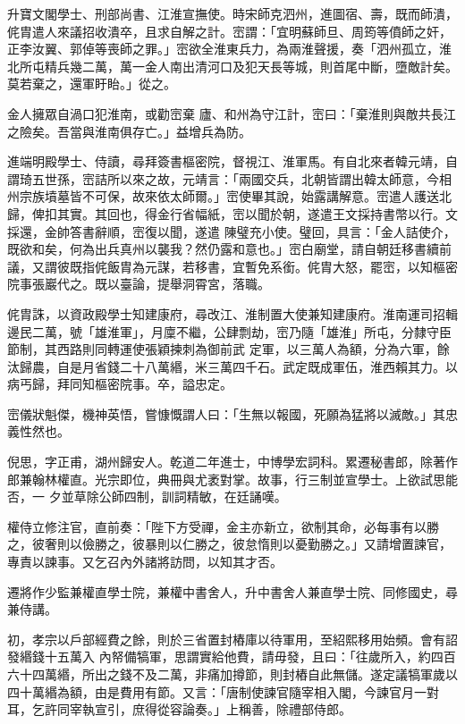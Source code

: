 \begin{pinyinscope}
 升寶文閣學士、刑部尚書、江淮宣撫使。時宋師克泗州，進圖宿、壽，既而師潰，侂胄遣人來議招收潰卒，且求自解之計。崈謂：「宜明蘇師旦、周筠等僨師之奸，正李汝翼、郭倬等喪師之罪。」崈欲全淮東兵力，為兩淮聲援，奏「泗州孤立，淮北所屯精兵幾二萬，萬一金人南出清河口及犯天長等城，則首尾中斷，墮敵計矣。莫若棄之，還軍盱眙。」從之。



 金人擁眾自渦口犯淮南，或勸崈棄
 廬、和州為守江計，崈曰：「棄淮則與敵共長江之險矣。吾當與淮南俱存亡。」益增兵為防。



 進端明殿學士、侍讀，尋拜簽書樞密院，督視江、淮軍馬。有自北來者韓元靖，自謂琦五世孫，崈詰所以來之故，元靖言：「兩國交兵，北朝皆謂出韓太師意，今相州宗族墳墓皆不可保，故來依太師爾。」崈使畢其說，始露講解意。崈遣人護送北歸，俾扣其實。其回也，得金行省幅紙，崈以聞於朝，遂遣王文採持書幣以行。文採還，金帥答書辭順，崈復以聞，遂遣
 陳璧充小使。璧回，具言：「金人詰使介，既欲和矣，何為出兵真州以襲我？然仍露和意也。」崈白廟堂，請自朝廷移書續前議，又謂彼既指侂飯胄為元謀，若移書，宜暫免系銜。侂胄大怒，罷崈，以知樞密院事張巖代之。既以臺論，提舉洞霄宮，落職。



 侂胄誅，以資政殿學士知建康府，尋改江、淮制置大使兼知建康府。淮南運司招輯邊民二萬，號「雄淮軍」，月廩不繼，公肆剽劫，崈乃隨「雄淮」所屯，分隸守臣節制，其西路則同轉運使張穎揀刺為御前武
 定軍，以三萬人為額，分為六軍，餘汰歸農，自是月省錢二十八萬緡，米三萬四千石。武定既成軍伍，淮西賴其力。以病丐歸，拜同知樞密院事。卒，謚忠定。



 崈儀狀魁傑，機神英悟，嘗慷慨謂人曰：「生無以報國，死願為猛將以滅敵。」其忠義性然也。



 倪思，字正甫，湖州歸安人。乾道二年進士，中博學宏詞科。累遷秘書郎，除著作郎兼翰林權直。光宗即位，典冊與尤袤對掌。故事，行三制並宣學士。上欲試思能否，一
 夕並草除公師四制，訓詞精敏，在廷誦嘆。



 權侍立修注官，直前奏：「陛下方受禪，金主亦新立，欲制其命，必每事有以勝之，彼奢則以儉勝之，彼暴則以仁勝之，彼怠惰則以憂勤勝之。」又請增置諫官，專責以諫事。又乞召內外諸將訪問，以知其才否。



 遷將作少監兼權直學士院，兼權中書舍人，升中書舍人兼直學士院、同修國史，尋兼侍講。



 初，孝宗以戶部經費之餘，則於三省置封樁庫以待軍用，至紹熙移用始頻。會有詔發緡錢十五萬入
 內帑備犒軍，思謂實給他費，請毋發，且曰：「往歲所入，約四百六十四萬緡，所出之錢不及二萬，非痛加撙節，則封樁自此無儲。遂定議犒軍歲以四十萬緡為額，由是費用有節。又言：「唐制使諫官隨宰相入閣，今諫官月一對耳，乞許同宰執宣引，庶得從容論奏。」上稱善，除禮部侍郎。




\end{pinyinscope}
